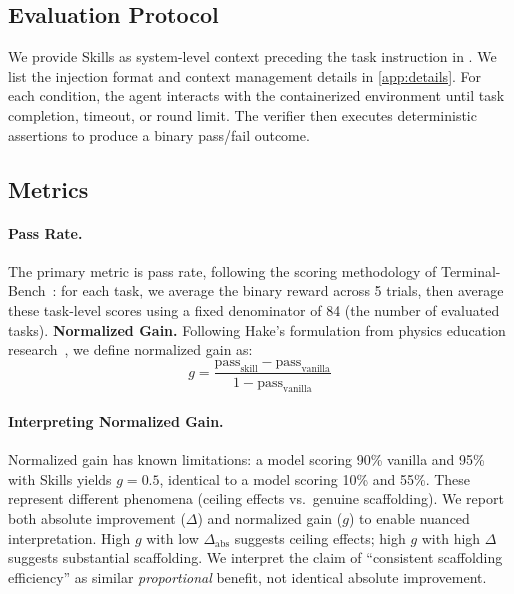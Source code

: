 \subsection{Evaluation Protocol}
\label{sec:protocol}

We provide Skills as system-level context preceding the task instruction in \benchmarkName{}.
We list the injection format and context management details in \autoref{app:details}.
For each condition, the agent interacts with the containerized environment until task completion, timeout, or round limit. The verifier then executes deterministic assertions to produce a binary pass/fail outcome.

\subsection{Metrics}
\label{sec:metrics}

\paragraph{Pass Rate.}
The primary metric is pass rate, following the scoring methodology of Terminal-Bench~\citep{merrill2026terminalbenchbenchmarkingagentshard}: for each task, we average the binary reward across 5 trials, then average these task-level scores using a fixed denominator of 84 (the number of evaluated tasks).
\noindent \textbf{Normalized Gain.} Following Hake's formulation from physics education research~\citep{hake1998interactive}, we define normalized gain as:
\begin{equation}
g = \frac{\text{pass}_{\text{skill}} - \text{pass}_{\text{vanilla}}}{1 - \text{pass}_{\text{vanilla}}}
\label{eq:normalized_gain}
\end{equation}

\paragraph{Interpreting Normalized Gain.}
Normalized gain has known limitations: a model scoring 90\% vanilla and 95\% with Skills yields $g=0.5$, identical to a model scoring 10\% and 55\%.
These represent different phenomena (ceiling effects vs.\ genuine scaffolding).
We report both absolute improvement ($\Delta$) and normalized gain ($g$) to enable nuanced interpretation.
High $g$ with low $\Delta_\text{abs}$ suggests ceiling effects; high $g$ with high $\Delta$ suggests substantial scaffolding.
We interpret the claim of ``consistent scaffolding efficiency'' as similar \emph{proportional} benefit, not identical absolute improvement.

